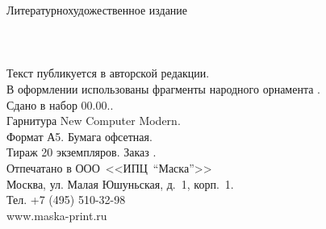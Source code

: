 {
\newpage
\thispagestyle{empty}
\begin{center}
{\small Литературно\sdash художественное издание}\\
\vspace{1.6cm}
{\Large \MyVarAuthorName}\\
\vspace{1.6cm}
{\Large\textbf\MyVarBookName}\\
\vspace{0.4cm}
{\large\textbf\MyVarBookNamesec}\\
\vspace{1.0cm}
{\small%
Текст публикуется в авторской редакции.\\
\vspace{1.0cm}
В оформлении использованы фрагменты народного орнамента \cite{КарельскаяВышивка,Королькова}.\\
\vspace{1.5cm}
Сдано в набор 00.00.\year.\\
Гарнитура New Computer Modern.\\
Формат А5. Бумага офсетная.\\
Тираж 20 экземпляров. Заказ .\\
\vspace{1.0cm}
Отпечатано в ООО~<<ИПЦ~"`Маска"'>>\\
Москва, ул. Малая Юшуньская, д.~1, корп.~1.\\
Тел. +7 (495) 510-32-98\\
www.maska-print.ru
}
\end{center}
}